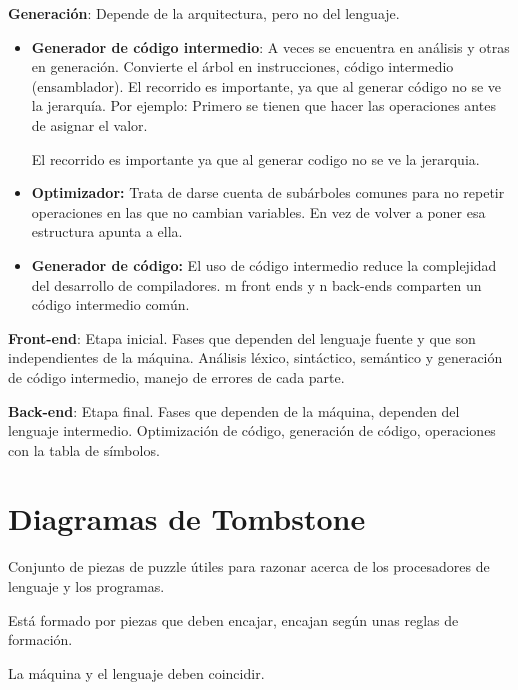 \documentclass[12pt, twoside, openright]{report} %
\begin{document}
\textbf{Generación}: Depende de la arquitectura, pero no del lenguaje.
\begin{itemize}
	\item \textbf{Generador de código intermedio}: A veces se encuentra en análisis y otras
	      en generación. Convierte el árbol en instrucciones, código
	      intermedio (ensamblador). El recorrido es importante, ya que al generar
	      código no se ve la jerarquía. Por ejemplo: Primero se tienen que hacer
	      las operaciones antes de asignar el valor.

	      El recorrido es importante ya que al generar codigo no se ve la jerarquia.
	\item \textbf{Optimizador:} Trata de darse cuenta de subárboles comunes para
	      no repetir operaciones en las que no cambian variables. En vez de volver
	      a poner esa estructura apunta a ella.
	\item \textbf{Generador de código:} El uso de código intermedio reduce la
	      complejidad del desarrollo de compiladores. m front ends y n back-ends
	      comparten un código intermedio común.

\end{itemize}

\textbf{Front-end}: Etapa inicial. Fases que dependen del lenguaje
fuente y que son independientes de la máquina. Análisis léxico,
sintáctico, semántico y generación de código intermedio, manejo de
errores de cada parte.

\textbf{Back-end}: Etapa final. Fases que dependen de la máquina,
dependen del lenguaje intermedio. Optimización de código, generación de
código, operaciones con la tabla de símbolos.

\pagebreak
\section{Diagramas de Tombstone}

Conjunto de piezas de puzzle útiles para razonar acerca de los
procesadores de lenguaje y los programas.

Está formado por piezas que deben encajar, encajan según unas reglas de
formación.

La máquina y el lenguaje deben coincidir.

\begin{figure}[H]
	{\def\svgwidth{.8\textwidth}
		}
\end{figure}
\end{document}
